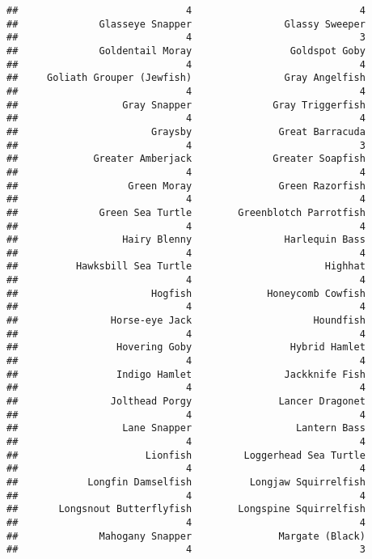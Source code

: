 \documentclass[
]{article}
\begin{document}
\begin{verbatim}
##                             4                             4 
##              Glasseye Snapper                Glassy Sweeper 
##                             4                             3 
##              Goldentail Moray                 Goldspot Goby 
##                             4                             4 
##     Goliath Grouper (Jewfish)                Gray Angelfish 
##                             4                             4 
##                  Gray Snapper              Gray Triggerfish 
##                             4                             4 
##                       Graysby               Great Barracuda 
##                             4                             3 
##             Greater Amberjack              Greater Soapfish 
##                             4                             4 
##                   Green Moray               Green Razorfish 
##                             4                             4 
##              Green Sea Turtle        Greenblotch Parrotfish 
##                             4                             4 
##                  Hairy Blenny                Harlequin Bass 
##                             4                             4 
##          Hawksbill Sea Turtle                       Highhat 
##                             4                             4 
##                       Hogfish             Honeycomb Cowfish 
##                             4                             4 
##                Horse-eye Jack                     Houndfish 
##                             4                             4 
##                 Hovering Goby                 Hybrid Hamlet 
##                             4                             4 
##                 Indigo Hamlet                Jackknife Fish 
##                             4                             4 
##                Jolthead Porgy               Lancer Dragonet 
##                             4                             4 
##                  Lane Snapper                  Lantern Bass 
##                             4                             4 
##                      Lionfish         Loggerhead Sea Turtle 
##                             4                             4 
##            Longfin Damselfish          Longjaw Squirrelfish 
##                             4                             4 
##       Longsnout Butterflyfish        Longspine Squirrelfish 
##                             4                             4 
##              Mahogany Snapper               Margate (Black) 
##                             4                             3 

\end{verbatim}
\end{document}
